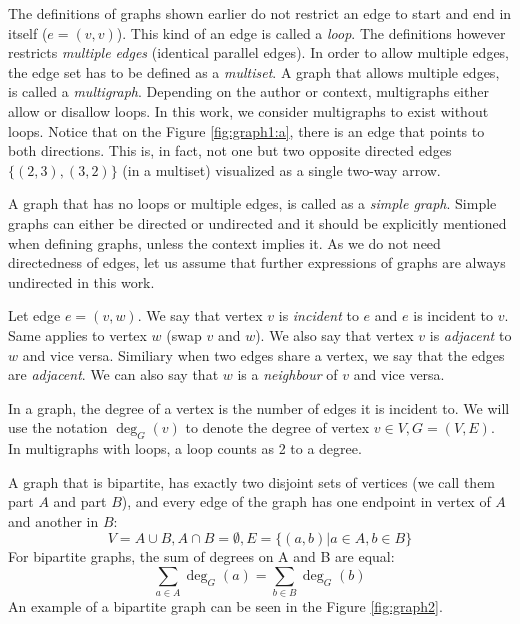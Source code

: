 The definitions of graphs shown earlier do not restrict an edge to start and end in itself ($e=(v, v)$).
This kind of an edge is called a \emph{loop}.
The definitions however restricts \emph{multiple edges} (identical parallel edges).
In order to allow multiple edges, the edge set has to be defined as a \emph{multiset}.
A graph that allows multiple edges, is called a \emph{multigraph}.
Depending on the author or context, multigraphs either allow or disallow loops.
In this work, we consider multigraphs to exist without loops.
Notice that on the Figure \ref{fig:graph1:a}, there is an edge that points to both directions.
This is, in fact, not one but two opposite directed edges $\{(2,3), (3,2)\}$ (in a multiset) visualized as a single two-way arrow.

A graph that has no loops or multiple edges, is called as a \emph{simple graph}.
Simple graphs can either be directed or undirected and it should be explicitly mentioned when defining graphs, unless the context implies it.
As we do not need directedness of edges, let us assume that further expressions of graphs are always undirected in this work.

Let edge $e=(v,w)$.
We say that vertex $v$ is \emph{incident} to $e$ and $e$ is incident to $v$.
Same applies to vertex $w$ (swap $v$ and $w$).
We also say that vertex $v$ is \emph{adjacent} to $w$ and vice versa.
Similiary when two edges share a vertex, we say that the edges are \emph{adjacent}.
We can also say that $w$ is a \emph{neighbour} of $v$ and vice versa.


In a graph, the degree of a vertex is the number of edges it is incident to.
We will use the notation $\deg_G(v)$ to denote the degree of vertex $v \in V, G=(V,E)$.
In multigraphs with loops, a loop counts as 2 to a degree.

A graph that is bipartite, has exactly two disjoint sets of vertices (we call them part $A$ and part $B$), and every edge of the graph has one endpoint in vertex of $A$ and another in $B$:
\begin{equation}
V = A \cup B, A \cap B = \emptyset, E=\{(a, b) | a \in A, b \in B\}
\end{equation}
For bipartite graphs, the sum of degrees on A and B are equal:
\begin{equation}
\sum_{a\in A} \deg_G(a) = \sum_{b\in B} \deg_G(b)
\end{equation}
An example of a bipartite graph can be seen in the Figure \ref{fig:graph2}.

